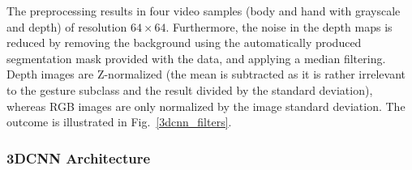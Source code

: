 The preprocessing results in four video samples (body and hand with grayscale and depth) of resolution $64\times64$.
Furthermore, the noise in the depth maps is reduced by removing the background using the automatically produced
segmentation mask provided with the data, and applying a  median filtering.
%
Depth images are Z-normalized (the mean is subtracted as it is rather irrelevant to the gesture subclass
and the result divided by the standard deviation), whereas
RGB images are only normalized by the image standard deviation.
The outcome is illustrated in Fig.~\ref{3dcnn_filters}.


\subsubsection{3DCNN Architecture}
\label{sec:3dcnnArchitecture}

